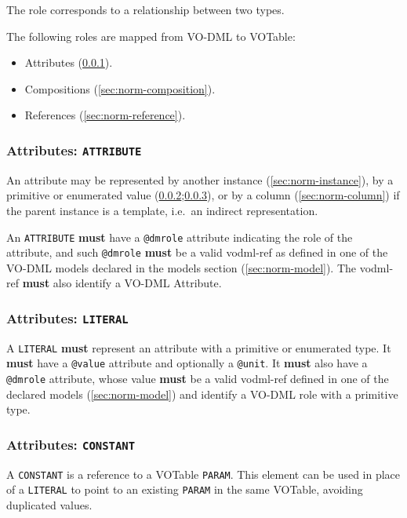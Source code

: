 \documentclass[11pt,a4paper]{ivoa}
\begin{document}
The role corresponds to a relationship between two types.

The following roles are mapped from VO-DML to VOTable:

\begin{itemize}
\itemsep1pt\parskip0pt
\item
  Attributes (\ref{sec:norm-attribute}).
\item
  Compositions (\ref{sec:norm-composition}).
\item
  References (\ref{sec:norm-reference}).
\end{itemize}

\subsubsection{Attributes: \texttt{ATTRIBUTE}}\label{sec:norm-attribute}

An attribute may be represented by another instance
(\ref{sec:norm-instance}), by a primitive or enumerated value
(\ref{sec:norm-literal};\ref{sec:norm-constant}), or by a column
(\ref{sec:norm-column}) if the parent instance is a template, i.e.~an
indirect representation.

An \texttt{ATTRIBUTE} \textbf{must} have a \texttt{@dmrole} attribute
indicating the role of the attribute, and such \texttt{@dmrole}
\textbf{must} be a valid vodml-ref as defined in one of the VO-DML
models declared in the models section (\ref{sec:norm-model}). The
vodml-ref \textbf{must} also identify a VO-DML Attribute.

\subsubsection{Attributes: \texttt{LITERAL}}\label{sec:norm-literal}

A \texttt{LITERAL} \textbf{must} represent an attribute with a primitive
or enumerated type. It \textbf{must} have a \texttt{@value} attribute
and optionally a \texttt{@unit}. It \textbf{must} also have a
\texttt{@dmrole} attribute, whose value \textbf{must} be a valid
vodml-ref defined in one of the declared models (\ref{sec:norm-model})
and identify a VO-DML role with a primitive type.

\subsubsection{Attributes: \texttt{CONSTANT}}\label{sec:norm-constant}

A \texttt{CONSTANT} is a reference to a VOTable \texttt{PARAM}. This
element can be used in place of a \texttt{LITERAL} to point to an
existing \texttt{PARAM} in the same VOTable, avoiding duplicated values.
\end{document}
